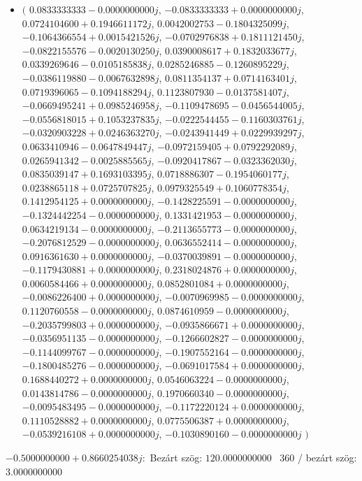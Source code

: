 \documentclass[14pt,a4paper]{article}
\begin{document}
\begin{itemize}
\item
$\big($
$0.0833333333-0.0000000000j$, $-0.0833333333+0.0000000000j$, $0.0724104600+0.1946611172j$, $0.0042002753-0.1804325099j$, $-0.1064366554+0.0015421526j$, $-0.0702976838+0.1811121450j$, $-0.0822155576-0.0020130250j$, $0.0390008617+0.1832033677j$, $0.0339269646-0.0105185838j$, $0.0285246885-0.1260895229j$, $-0.0386119880-0.0067632898j$, $0.0811354137+0.0714163401j$, $0.0719396065-0.1094188294j$, $0.1123807930-0.0137581407j$, $-0.0669495241+0.0985246958j$, $-0.1109478695-0.0456544005j$, $-0.0556818015+0.1053237835j$, $-0.0222544455-0.1160303761j$, $-0.0320903228+0.0246363270j$, $-0.0243941449+0.0229939297j$, $0.0633410946-0.0647849447j$, $-0.0972159405+0.0792292089j$, $0.0265941342-0.0025885565j$, $-0.0920417867-0.0323362030j$, $0.0835039147+0.1693103395j$, $0.0718886307-0.1954060177j$, $0.0238865118+0.0725707825j$, $0.0979325549+0.1060778354j$, $0.1412954125+0.0000000000j$, $-0.1428225591-0.0000000000j$, $-0.1324442254-0.0000000000j$, $0.1331421953-0.0000000000j$, $0.0634219134-0.0000000000j$, $-0.2113655773-0.0000000000j$, $-0.2076812529-0.0000000000j$, $0.0636552414-0.0000000000j$, $0.0916361630+0.0000000000j$, $-0.0370039891-0.0000000000j$, $-0.1179430881+0.0000000000j$, $0.2318024876+0.0000000000j$, $0.0060584466+0.0000000000j$, $0.0852801084+0.0000000000j$, $-0.0086226400+0.0000000000j$, $-0.0070969985-0.0000000000j$, $0.1120760558-0.0000000000j$, $0.0874610959-0.0000000000j$, $-0.2035799803+0.0000000000j$, $-0.0935866671+0.0000000000j$, $-0.0356951135-0.0000000000j$, $-0.1266602827-0.0000000000j$, $-0.1144099767-0.0000000000j$, $-0.1907552164-0.0000000000j$, $-0.1800485276-0.0000000000j$, $-0.0691017584+0.0000000000j$, $0.1688440272+0.0000000000j$, $0.0546063224-0.0000000000j$, $0.0143814786-0.0000000000j$, $0.1970660340-0.0000000000j$, $-0.0095483495-0.0000000000j$, $-0.1172220124+0.0000000000j$, $0.1110528882+0.0000000000j$, $0.0775506387+0.0000000000j$, $-0.0539216108+0.0000000000j$, $-0.1030890160-0.0000000000j$
$\big)$
\end{itemize}
$-0.5000000000+0.8660254038j$:\
Bezárt szög: $120.0000000000$ \
360 / bezárt szög: $3.0000000000$\
\end{document}
